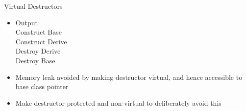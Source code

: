 \documentclass{beamer}
\begin{document}
\begin{frame}[fragile]{Virtual Destructors}
  \begin{itemize}
    \item Output\\
      Construct Base\\
      Construct Derive\\
      Destroy Derive\\
      Destroy Base\pause
    \item Memory leak avoided by making destructor virtual, and hence accessible to base class pointer\pause
    \item Make destructor protected and non-virtual to deliberately avoid this
  \end{itemize}
\end{frame}




\end{document}
